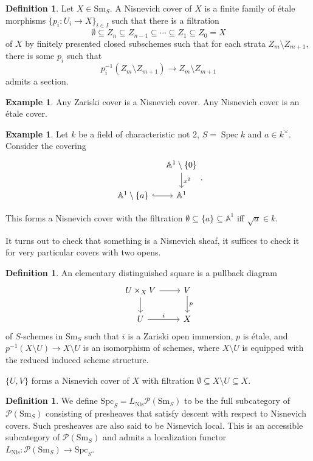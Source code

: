 \documentclass{shortart}
\theoremstyle{definition}
\newtheorem{defi}[thm]{Definition}
\newtheorem{eg}[thm]{Example}
\newcommand\Sm{\mathrm{Sm}}
\newcommand\Spc{\mathrm{Spc}}
\newcommand\Nis{\mathrm{Nis}}
\newcommand\Pre{\mathcal{P}}
\newcommand\A{\mathbb{A}}
\DeclareMathOperator\Spec{Spec}
\begin{document}
\begin{defi}
  Let $X \in \Sm_S$. A Nisnevich cover of $X$ is a finite family of \'etale morphisms $\{p_i: U_i \to X\}_{i \in I}$ such that there is a filtration
  \[
    \emptyset \subseteq Z_n \subseteq Z_{n - 1} \subseteq \cdots \subseteq Z_1 \subseteq Z_0 = X
  \]
  of $X$ by finitely presented closed subschemes such that for each strata $Z_m \setminus Z_{m + 1}$, there is some $p_i$ such that
  \[
    p_i^{-1}(Z_m \setminus Z_{m + 1}) \to Z_m \setminus Z_{m + 1}
  \]
  admits a section.
\end{defi}

\begin{eg}
  Any Zariski cover is a Nisnevich cover. Any Nisnevich cover is an \'etale cover.
\end{eg}

\begin{eg}
  Let $k$ be a field of characteristic not $2$, $S = \Spec k$ and $a \in k^\times$. Consider the covering
  \[
    \begin{tikzcd}[column sep=small]
      & \A^1 \setminus \{0\} \ar[d, "x^2"]\\
      \A^1 \setminus \{a\} \ar[r, hook] & \A^1
    \end{tikzcd}.
  \]

  This forms a Nisnevich cover with the filtration $\emptyset \subseteq \{a\} \subseteq \A^1$ iff $\sqrt{a} \in k$.
\end{eg}

It turns out to check that something is a Nisnevich sheaf, it suffices to check it for very particular covers with two opens.

\begin{defi}
  An elementary distinguished square is a pullback diagram
  \[
    \begin{tikzcd}
      U \times_X V \ar[r] \ar[d] & V \ar[d, "p"]\\
      U \ar[r, "i"] & X
    \end{tikzcd}
  \]
  of $S$-schemes in $\Sm_S$ such that $i$ is a Zariski open immersion, $p$ is \'etale, and $p^{-1}(X \setminus U) \to X \setminus U$ is an isomorphism of schemes, where $X \setminus U$ is equipped with the reduced induced scheme structure.
\end{defi}
$\{U, V\}$ forms a Nisnevich cover of $X$ with filtration $\emptyset \subseteq X \setminus U \subseteq X$.

\begin{defi}
  We define $\Spc_S = L_{\Nis}\Pre(\Sm_S)$ to be the full subcategory of $\Pre(\Sm_S)$ consisting of presheaves that satisfy descent with respect to Nisnevich covers. Such presheaves are also said to be Nisnevich local. This is an accessible subcategory of $\Pre(\Sm_S)$ and admits a localization functor $L_{\Nis} : \Pre(\Sm_S) \to \Spc_S$.
\end{defi}
\end{document}
